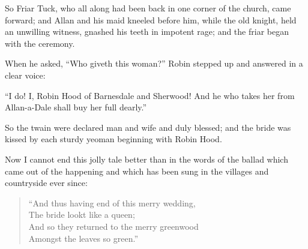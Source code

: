 So Friar Tuck, who all along had been back in one corner of the church,
came forward; and Allan and his maid kneeled before him, while the old
knight, held an unwilling witness, gnashed his teeth in impotent rage;
and the friar began with the ceremony.

When he asked, ``Who giveth this woman?'' Robin stepped up and answered
in a clear voice:

``I do! I, Robin Hood of Barnesdale and Sherwood! And he who takes her
from Allan-a-Dale shall buy her full dearly.''

So the twain were declared man and wife and duly blessed; and the bride
was kissed by each sturdy yeoman beginning with Robin Hood.

Now I cannot end this jolly tale better than in the words of the ballad
which came out of the happening and which has been sung in the villages
and countryside ever since:

\begin{quote}
“And thus having end of this merry wedding,\\
The bride lookt like a queen;\\
And so they returned to the merry greenwood\\
Amongst the leaves so green.”
\end{quote}
